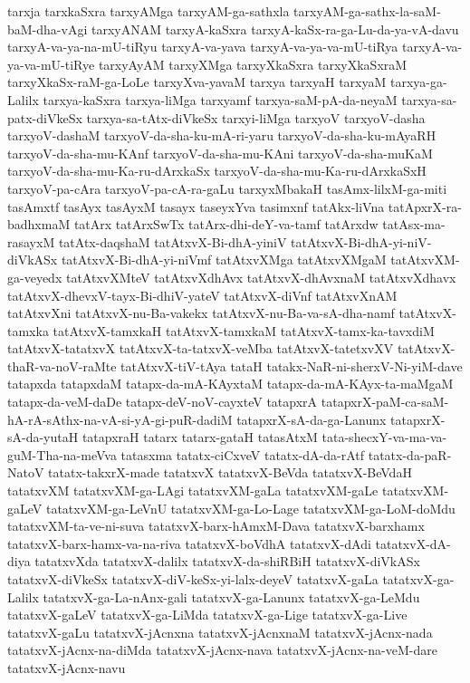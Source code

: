 {tarxja
tarxkaSxra
tarxyAMga
tarxyAM-ga-sathxla
tarxyAM-ga-sathx-la-saM-baM-dha-vAgi
tarxyANAM
tarxyA-kaSxra
tarxyA-kaSx-ra-ga-Lu-da-ya-vA-davu
tarxyA-va-ya-na-mU-tiRyu
tarxyA-va-yava
tarxyA-va-ya-va-mU-tiRya
tarxyA-va-ya-va-mU-tiRye
tarxyAyAM
tarxyXMga
tarxyXkaSxra
tarxyXkaSxraM
tarxyXkaSx-raM-ga-LoLe
tarxyXva-yavaM
tarxya
tarxyaH
tarxyaM
tarxya-ga-Lalilx
tarxya-kaSxra
tarxya-liMga
tarxyamf
tarxya-saM-pA-da-neyaM
tarxya-sa-patx-diVkeSx
tarxya-sa-tAtx-diVkeSx
tarxyi-liMga
tarxyoV
tarxyoV-dasha
tarxyoV-dashaM
tarxyoV-da-sha-ku-mA-ri-yaru
tarxyoV-da-sha-ku-mAyaRH
tarxyoV-da-sha-mu-KAnf
tarxyoV-da-sha-mu-KAni
tarxyoV-da-sha-muKaM
tarxyoV-da-sha-mu-Ka-ru-dArxkaSx
tarxyoV-da-sha-mu-Ka-ru-dArxkaSxH
tarxyoV-pa-cAra
tarxyoV-pa-cA-ra-gaLu
tarxyxMbakaH
tasAmx-lilxM-ga-miti
tasAmxtf
tasAyx
tasAyxM
tasayx
taseyxYva
tasimxnf
tatAkx-liVna
tatApxrX-ra-badhxmaM
tatArx
tatArxSwTx
tatArx-dhi-deY-va-tamf
tatArxdw
tatAsx-ma-rasayxM
tatAtx-daqshaM
tatAtxvX-Bi-dhA-yiniV
tatAtxvX-Bi-dhA-yi-niV-diVkASx
tatAtxvX-Bi-dhA-yi-niVmf
tatAtxvXMga
tatAtxvXMgaM
tatAtxvXM-ga-veyedx
tatAtxvXMteV
tatAtxvXdhAvx
tatAtxvX-dhAvxnaM
tatAtxvXdhavx
tatAtxvX-dhevxV-tayx-Bi-dhiV-yateV
tatAtxvX-diVnf
tatAtxvXnAM
tatAtxvXni
tatAtxvX-nu-Ba-vakekx
tatAtxvX-nu-Ba-va-sA-dha-namf
tatAtxvX-tamxka
tatAtxvX-tamxkaH
tatAtxvX-tamxkaM
tatAtxvX-tamx-ka-tavxdiM
tatAtxvX-tatatxvX
tatAtxvX-ta-tatxvX-veMba
tatAtxvX-tatetxvXV
tatAtxvX-thaR-va-noV-raMte
tatAtxvX-tiV-tAya
tataH
tatakx-NaR-ni-sherxV-Ni-yiM-dave
tatapxda
tatapxdaM
tatapx-da-mA-KAyxtaM
tatapx-da-mA-KAyx-ta-maMgaM
tatapx-da-veM-daDe
tatapx-deV-noV-cayxteV
tatapxrA
tatapxrX-paM-ca-saM-hA-rA-sAthx-na-vA-si-yA-gi-puR-dadiM
tatapxrX-sA-da-ga-Lanunx
tatapxrX-sA-da-yutaH
tatapxraH
tatarx
tatarx-gataH
tatasAtxM
tata-shecxY-va-ma-va-guM-Tha-na-meVva
tatasxma
tatatx-ciCxveV
tatatx-dA-da-rAtf
tatatx-da-paR-NatoV
tatatx-takxrX-made
tatatxvX
tatatxvX-BeVda
tatatxvX-BeVdaH
tatatxvXM
tatatxvXM-ga-LAgi
tatatxvXM-gaLa
tatatxvXM-gaLe
tatatxvXM-gaLeV
tatatxvXM-ga-LeVnU
tatatxvXM-ga-Lo-Lage
tatatxvXM-ga-LoM-doMdu
tatatxvXM-ta-ve-ni-suva
tatatxvX-barx-hAmxM-Dava
tatatxvX-barxhamx
tatatxvX-barx-hamx-va-na-riva
tatatxvX-boVdhA
tatatxvX-dAdi
tatatxvX-dA-diya
tatatxvXda
tatatxvX-dalilx
tatatxvX-da-shiRBiH
tatatxvX-diVkASx
tatatxvX-diVkeSx
tatatxvX-diV-keSx-yi-lalx-deyeV
tatatxvX-gaLa
tatatxvX-ga-Lalilx
tatatxvX-ga-La-nAnx-gali
tatatxvX-ga-Lanunx
tatatxvX-ga-LeMdu
tatatxvX-gaLeV
tatatxvX-ga-LiMda
tatatxvX-ga-Lige
tatatxvX-ga-Live
tatatxvX-gaLu
tatatxvX-jAcnxna
tatatxvX-jAcnxnaM
tatatxvX-jAcnx-nada
tatatxvX-jAcnx-na-diMda
tatatxvX-jAcnx-nava
tatatxvX-jAcnx-na-veM-dare
tatatxvX-jAcnx-navu
}
